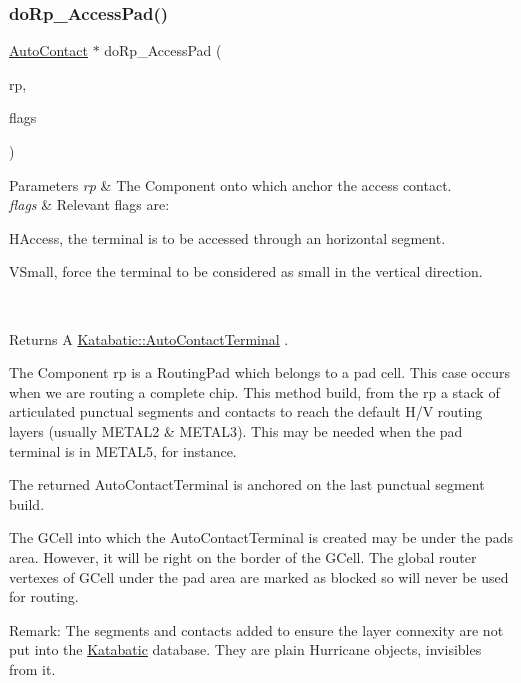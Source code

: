 \subsubsection{\texorpdfstring{do\+Rp\+\_\+\+Access\+Pad()}{doRp\_AccessPad()}}
{\footnotesize\ttfamily \mbox{\hyperlink{classKatabatic_1_1AutoContact}{Auto\+Contact}} $\ast$ do\+Rp\+\_\+\+Access\+Pad (\begin{DoxyParamCaption}\item[{\textbf{ Routing\+Pad} $\ast$}]{rp,  }\item[{unsigned int}]{flags }\end{DoxyParamCaption})\hspace{0.3cm}{\ttfamily [static]}}


\begin{DoxyParams}{Parameters}
{\em rp} & The Component onto which anchor the access contact. \\
\hline
{\em flags} & Relevant flags are\+:
\begin{DoxyItemize}
\item H\+Access, the terminal is to be accessed through an horizontal segment.
\item V\+Small, force the terminal to be considered as small in the vertical direction. 
\end{DoxyItemize}\\
\hline
\end{DoxyParams}
\begin{DoxyReturn}{Returns}
A \mbox{\hyperlink{classKatabatic_1_1AutoContactTerminal}{Katabatic\+::\+Auto\+Contact\+Terminal}} .
\end{DoxyReturn}
The Component {\ttfamily rp} is a Routing\+Pad which belongs to a pad cell. This case occurs when we are routing a complete chip. This method build, from the {\ttfamily rp} a stack of articulated punctual segments and contacts to reach the default H/V routing layers (usually {\ttfamily M\+E\+T\+A\+L2} \& {\ttfamily M\+E\+T\+A\+L3}). This may be needed when the pad terminal is in {\ttfamily M\+E\+T\+A\+L5}, for instance.

The returned Auto\+Contact\+Terminal is anchored on the last punctual segment build.

The G\+Cell into which the Auto\+Contact\+Terminal is created may be under the pads area. However, it will be right on the border of the G\+Cell. The global router vertexes of G\+Cell under the pad area are marked as blocked so will never be used for routing.

\begin{DoxyParagraph}{Remark\+: The segments and contacts added to ensure the layer connexity are not}
put into the \mbox{\hyperlink{namespaceKatabatic}{Katabatic}} database. They are plain Hurricane objects, invisibles from it. 
\end{DoxyParagraph}


